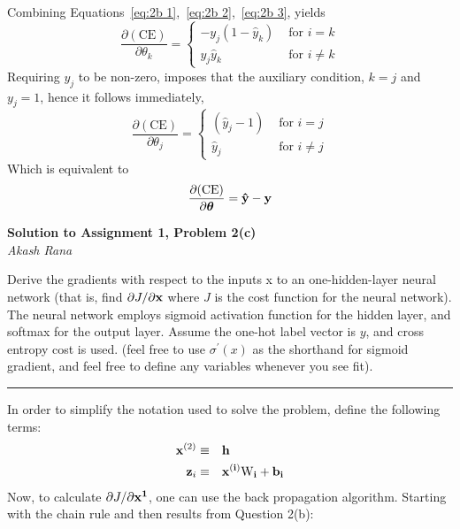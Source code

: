 \documentclass[letter,12pt]{article}
\newcommand{\myhwtitle}[3]
{\begin{center}
{\large {\bf Solution to Assignment {#1}, Problem {#2}}}\\
\medskip
{\it {#3}} %
\end{center}}
\newcommand{\solutionsAuthor}{Akash Rana}
\begin{document}
Combining Equations~\ref{eq:2b 1},~\ref{eq:2b 2},~\ref{eq:2b 3}, yields
\begin{equation}
\frac{\partial(\textrm{CE})}{\partial{\theta_{k}}} = \begin{cases}
-y_{j}(1 - \hat{y}_{k})&\text{ for }i=k \\
y_{j}\hat{y}_{k}&\text{ for }i\neq k
\end{cases}
\end{equation}
Requiring $y_{j}$ to be non-zero, imposes that the auxiliary condition, $k=j$ and $y_{j}=1$, hence it follows immediately,
\begin{equation}
\frac{\partial(\textrm{CE})}{\partial{\theta_{j}}} = \begin{cases}
(\hat{y}_{j} - 1)&\text{ for }i=j\label{eq:2b case 1} \\
\hat{y}_{j}&\text{ for }i\neq j
\end{cases}
\end{equation}
Which is equivalent to
\begin{equation}
\frac{\partial(\textrm{CE})}{\partial{\boldsymbol\theta}} = \bf{\hat{y}} - \bf{y}
\end{equation}

\clearpage

\myhwtitle{1}{2(c)}{\solutionsAuthor}
\bigskip

\noindent Derive the gradients with respect to the inputs x to an one-hidden-layer neural network (that is, find
$\partial{J}/\partial{\bf x}$ where $J$ is the cost function for the neural network). The neural network employs sigmoid activation
function for the hidden layer, and softmax for the output layer. Assume the one-hot label vector is $y$,
and cross entropy cost is used. (feel free to use $\sigma^{\prime}(x)$ as the shorthand for sigmoid gradient, and feel free
to define any variables whenever you see fit). \vspace{5mm}\\

\noindent\rule{\textwidth}{0.4pt}\vspace{5mm}
In order to simplify the notation used to solve the problem, define the following terms:
\begin{align}
{\bf x}^{(2)} \equiv & \quad{\bf h} \\
{\bf z}_{i}     \equiv& \quad{\bf x^{(i)}\textrm{W}_{i} + b_{i}}
\end{align}
Now, to calculate $\partial{J}/\partial{\bf x^{1}}$, one can use the back propagation algorithm. Starting with the chain rule and then results from Question 2(b):
\end{document}
